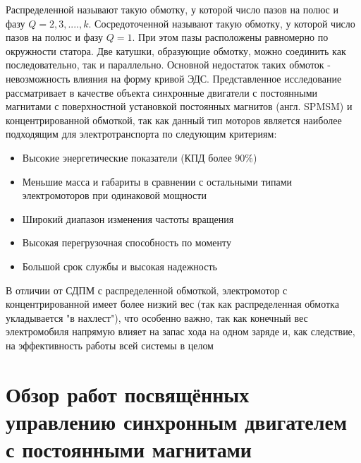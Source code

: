 Распределенной называют такую обмотку, у которой число пазов на полюс и фазу $Q = 2, 3,...., k$.
Сосредоточенной называют такую обмотку, у которой число пазов на полюс и фазу $Q = 1$. При этом пазы расположены равномерно по окружности статора. Две катушки, образующие обмотку, можно соединить как последовательно, так и параллельно. Основной недостаток таких обмоток - невозможность влияния на форму кривой ЭДС.
Представленное исследование рассматривает в качестве объекта синхронные двигатели с постоянными магнитами с поверхностной установкой постоянных магнитов (англ. SPMSM) и концентрированной обмоткой, так как данный тип моторов является наиболее подходящим для электротранспорта по следующим критериям: 

\begin{itemize}
\item Высокие энергетические показатели (КПД более $90\%$)
\item Меньшие масса и габариты в сравнении с остальными типами электромоторов при одинаковой мощности
\item Широкий диапазон изменения частоты вращения
\item Высокая перегрузочная способность по моменту
\item Большой срок службы и высокая надежность
\end{itemize}

В отличии от СДПМ с распределенной обмоткой, электромотор с концентрированной имеет более низкий вес (так как распределенная обмотка укладывается "в нахлест"), что особенно важно, так как конечный вес электромобиля напрямую влияет на запас хода на одном заряде и, как следствие, на эффективность работы всей системы в целом

\section{Обзор работ посвящённых управлению синхронным двигателем с постоянными магнитами} \label{sec:ch1/sec4}

